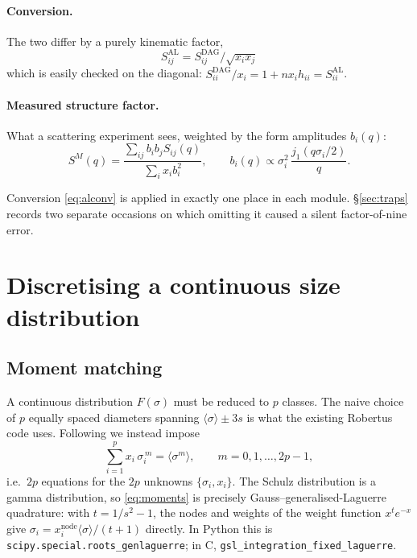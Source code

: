\documentclass[11pt,a4paper]{article}
\newcommand{\code}[1]{\texttt{\hspace{0pt}#1}}
\begin{document}
\paragraph{Conversion.} The two differ by a purely kinematic factor,
\begin{equation}
\boxed{\;S^{\mathrm{AL}}_{ij} = S^{\mathrm{DAG}}_{ij}\big/\sqrt{x_i x_j}\;}
\label{eq:alconv}
\end{equation}
which is easily checked on the diagonal: $S^{\mathrm{DAG}}_{ii}/x_i
= 1+n x_i \hat h_{ii} = S^{\mathrm{AL}}_{ii}$.

\paragraph{Measured structure factor.} What a scattering experiment sees,
weighted by the form amplitudes $b_i(q)$:
\begin{equation}
S^{M}(q) = \frac{\sum_{ij} b_i b_j S_{ij}(q)}{\sum_i x_i b_i^2},
\qquad
b_i(q)\propto \sigma_i^2\,\frac{j_1(q\sigma_i/2)}{q}.
\end{equation}

Conversion \eqref{eq:alconv} is applied in exactly one place in each module.
\S\ref{sec:traps} records two separate occasions on which omitting it caused
a silent factor-of-nine error.

\section{Discretising a continuous size distribution}
\label{sec:moments}

\subsection{Moment matching}

A continuous distribution $F(\sigma)$ must be reduced to $p$ classes. The
naive choice of $p$ equally spaced diameters spanning
$\langle\sigma\rangle\pm3s$ is what the existing Robertus code uses. Following
\cite{DAguannoKlein1992} we instead impose
\begin{equation}
\sum_{i=1}^{p} x_i\,\sigma_i^{\,m} = \langle\sigma^m\rangle,
\qquad m=0,1,\dots,2p-1,
\label{eq:moments}
\end{equation}
i.e.\ $2p$ equations for the $2p$ unknowns $\{\sigma_i,x_i\}$. The Schulz
distribution is a gamma distribution, so \eqref{eq:moments} is precisely
Gauss--generalised-Laguerre quadrature: with $t=1/s^2-1$, the nodes and
weights of the weight function $x^{t}e^{-x}$ give
$\sigma_i = x_i^{\mathrm{node}}\langle\sigma\rangle/(t+1)$ directly. In Python
this is \code{scipy.special.roots\_genlaguerre}; in C,
\code{gsl\_integration\_fixed\_laguerre}.
\end{document}
